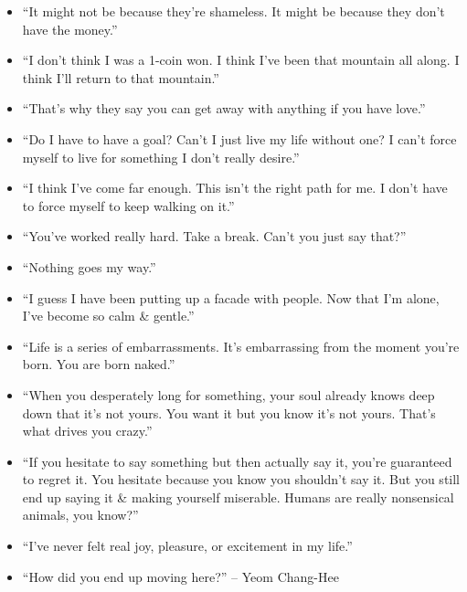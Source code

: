 \documentclass[oneside]{book}
\numberwithin{equation}{section}
\begin{document}
\begin{enumerate}
\begin{itemize}
		\item ``It might not be because they're shameless. It might be because they don't have the money.''
		\item ``I don't think I was a 1-coin won. I think I've been that mountain all along. I think I'll return to that mountain.''
		\item ``That's why they say you can get away with anything if you have love.''
		\item ``Do I have to have a goal? Can't I just live my life without one? I can't force myself to live for something I don't really desire.''
		\item ``I think I've come far enough. This isn't the right path for me. I don't have to force myself to keep walking on it.''
		\item ``You've worked really hard. Take a break. Can't you just say that?''
		\item ``Nothing goes my way.''
		\item ``I guess I have been putting up a facade with people. Now that I'm alone, I've become so calm \& gentle.''
		\item ``Life is a series of embarrassments. It's embarrassing from the moment you're born. You are born naked.''
		\item ``When you desperately long for something, your soul already knows deep down that it's not yours. You want it but you know it's not yours. That's what drives you crazy.''
		\item ``If you hesitate to say something but then actually say it, you're guaranteed to regret it. You hesitate because you know you shouldn't say it. But you still end up saying it \& making yourself miserable. Humans are really nonsensical animals, you know?''
		\item ``I've never felt real joy, pleasure, or excitement in my life.''
		\item ``How did you end up moving here?'' -- Yeom Chang-Hee
		

\end{itemize}
\end{enumerate}
\end{document}
